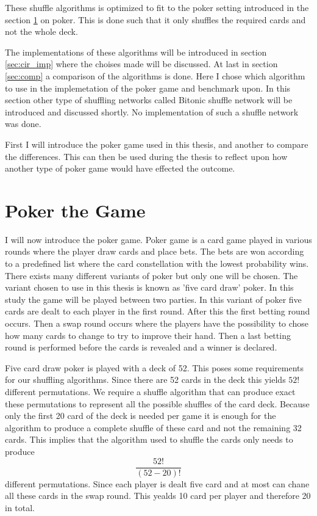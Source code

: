 \documentclass[twoside,11pt,openright]{report}
\begin{document}
These shuffle algorithms is optimized to fit to the poker setting introduced in the section \ref{sec:poker} on poker. This is done such that it only shuffles the required cards and not the whole deck.

The implementations of these algorithms will be introduced in section \ref{sec:cir_imp} where the choises made will be discussed. At last in section \ref{sec:comp} a comparison of the algorithms is done. Here I chose which algorithm to use in the implemetation of the poker game and benchmark upon. In this section other type of shuffling networks called Bitonic shuffle network will be introduced and discussed shortly. No implementation of such a shuffle network was done.

First I will introduce the poker game used in this thesis, and another to compare the differences. This can then be used during the thesis to reflect upon how another type of poker game would have effected the outcome.

\section{Poker the Game}
\label{sec:poker}
I will now introduce the poker game. Poker game is a card game played in various rounds where the player draw cards and place bets. The bets are won according to a predefined list where the card constellation with the lowest probability wins. There exists many different variants of poker but only one will be chosen. The variant chosen to use in this thesis is known as 'five card draw' poker. In this study the game will be played between two parties. In this variant of poker five cards are dealt to each player in the first round. After this the first betting round occurs. Then a swap round occurs where the players have the possibility to chose how many cards to change to try to improve their hand. Then a last betting round is performed before the cards is revealed and a winner is declared.

Five card draw poker is played with a deck of 52. This poses some requirements for our shuffling algorithms. Since there are 52 cards in the deck this yields $52!$ different permutations. We require a shuffle algorithm that can produce exact these permutations to represent all the possible shuffles of the card deck. Because only the first 20 card of the deck is needed per game it is enough for the algorithm to produce a complete shuffle of these card and not the remaining 32 cards. This implies that the algorithm used to shuffle the cards only needs to produce $$\frac{52!}{(52-20)!}$$ different permutations. Since each player is dealt five card and at most can chane all these cards in the swap round. This yealds 10 card per player and therefore 20 in total.
\end{document}
